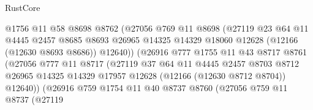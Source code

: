 \begin{lexlean}{RustCore}
\begin{coremodule}
                                @1756
                                @11
                                @58
                                @8698
                                @8762
                                (@27056
                                  @769
                                  @11
                                  @8698
                                  (@27119
                                    @23
                                    @64
                                    @11
                                    @4445
                                    @2457
                                    @8685
                                    @8693
                                    @26965
                                    @14325
                                    @14329
                                    @18060
                                    @12628
                                    (@12166 (@12630 @8693 @8686))
                                    @12640))
                                (@26916
                                  @777
                                  @1755
                                  @11
                                  @43
                                  @8717
                                  @8761
                                  (@27056
                                    @777
                                    @11
                                    @8717
                                    (@27119
                                      @37
                                      @64
                                      @11
                                      @4445
                                      @2457
                                      @8703
                                      @8712
                                      @26965
                                      @14325
                                      @14329
                                      @17957
                                      @12628
                                      (@12166 (@12630 @8712 @8704))
                                      @12640))
                                  (@26916
                                    @759
                                    @1754
                                    @11
                                    @40
                                    @8737
                                    @8760
                                    (@27056
                                      @759
                                      @11
                                      @8737
                                      (@27119

\end{coremodule}
\end{lexlean}
